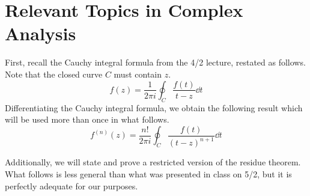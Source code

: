 \documentclass[titlepage]{article}
\numberwithin{equation}{section}
\begin{document}
\section{Relevant Topics in Complex Analysis}\label{sse:complex}
First, recall the Cauchy integral formula from the 4/2 lecture, restated as follows. Note that the closed curve $C$ must contain $z$.
\begin{equation*}
    f(z) = \frac{1}{2\pi i}\oint_C\frac{f(t)}{t-z}\dd{t}
\end{equation*}
Differentiating the Cauchy integral formula, we obtain the following result which will be used more than once in what follows.
\begin{equation*}
    f^{(n)}(z) = \frac{n!}{2\pi i}\oint_C\frac{f(t)}{(t-z)^{n+1}}\dd{t}
\end{equation*}\par
Additionally, we will state and prove a restricted version of the residue theorem. What follows is less general than what was presented in class on 5/2, but it is perfectly adequate for our purposes.
\end{document}
